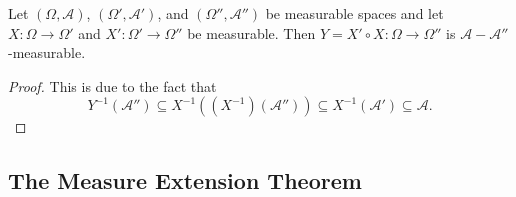 \begin{theorem}
        Let $(\Omega,\mathcal{A})$, $(\Omega',\mathcal{A}')$, and $(\Omega'',\mathcal{A}'')$ be measurable spaces and let $X:\Omega\to\Omega'$ and $X':\Omega'\to\Omega''$ be measurable. Then $Y=X'\circ X:\Omega\to\Omega''$ is $\mathcal{A}-\mathcal{A}''$-measurable.
\end{theorem}
\begin{proof}
    This is due to the fact that
    $$Y^{-1}(\mathcal{A}'')\subseteq X^{-1}((X^{-1})(\mathcal{A}''))\subseteq X^{-1}(\mathcal{A}')\subseteq \mathcal{A}.$$
\end{proof}

\subsection{The Measure Extension Theorem}

